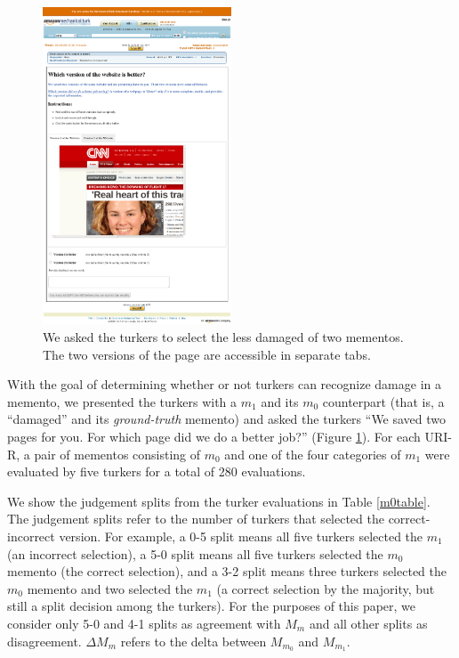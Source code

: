 \begin{figure}[h!]
\includegraphics[width=0.50\textwidth]{./imgs/turkss.png}
\caption{We asked the turkers to select the less damaged of two mementos. The two versions of the page are accessible in separate tabs.}
\label{turkss}
\end{figure}


With the goal of determining whether or not turkers can recognize damage in a memento, we presented the turkers with a $m_1$ and its $m_0$ counterpart (that is, a ``damaged'' and its \emph{ground-truth} memento) and asked the turkers ``We saved two pages for you. For which page did we do a better job?'' (Figure \ref{turkss}). For each URI-R, a pair of mementos consisting of $m_0$ and one of the four categories of $m_1$ were evaluated by five turkers for a total of 280 evaluations. 

We show the judgement splits from the turker evaluations in Table \ref{m0table}. The judgement splits refer to the number of turkers that selected the correct-incorrect version. For example, a 0-5 split means all five turkers selected the $m_1$ (an incorrect selection), a 5-0 split means all five turkers selected the $m_0$ memento (the correct selection), and a 3-2 split means three turkers selected the $m_0$ memento and two selected the $m_1$ (a correct selection by the majority, but still a split decision among the turkers). For the purposes of this paper, we consider only 5-0 and 4-1 splits as agreement with $M_m$ and all other splits as disagreement. {$\Delta M_m$} refers to the delta between $M_{m_0}$ and $M_{m_1}$.

